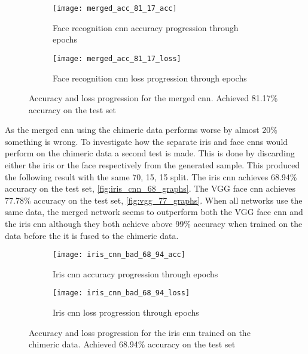 \begin{figure}[H]
	\centering
	\begin{subfigure}{0.48\textwidth}
		\centering
		\texttt{[image: merged\_acc\_81\_17\_acc]}
		\caption{Face recognition \gls{cnn} accuracy progression through epochs}
		\label{fig:merged_acc}
	\end{subfigure}
	\begin{subfigure}{0.48\textwidth}
		\centering
		\texttt{[image: merged\_acc\_81\_17\_loss]}
		\caption{Face recognition \gls{cnn} loss progression through epochs}
		\label{fig:merged_loss}
	\end{subfigure}
	\caption{Accuracy and loss progression for the merged \gls{cnn}. Achieved 81.17\% accuracy on the test set}
	\label{fig:merged_graphs}
\end{figure}

\noindent As the merged \gls{cnn} using the chimeric data performs worse by almost 20\% something is wrong. To investigate how the separate iris and face \gls{cnn}s would perform on the chimeric data a second test is made. This is done by discarding either the iris or the face respectively from the generated sample. This produced the following result with the same 70, 15, 15 split.  The iris \gls{cnn} achieves 68.94\% accuracy on the test set, \autoref{fig:iris_cnn_68_graphs}. The VGG face \gls{cnn} achieves 77.78\% accuracy on the test set, \autoref{fig:vgg_77_graphs}. When all networks use the same data, the merged network seems to outperform both the VGG face \gls{cnn} and the iris \gls{cnn} although they both achieve above 99\% accuracy when trained on the data before the it is fused to the chimeric data.

\begin{figure}[H]
	\centering
	\begin{subfigure}{0.48\textwidth}
		\centering
		\texttt{[image: iris\_cnn\_bad\_68\_94\_acc]}
		\caption{Iris \gls{cnn} accuracy progression through epochs}
		\label{fig:iris_cnn_68_acc}
	\end{subfigure}
	\begin{subfigure}{0.48\textwidth}
		\centering
		\texttt{[image: iris\_cnn\_bad\_68\_94\_loss]}
		\caption{Iris \gls{cnn} loss progression through epochs}
		\label{fig:iris_cnn_68_loss}
	\end{subfigure}
	\caption{Accuracy and loss progression for the iris \gls{cnn} trained on the chimeric data. Achieved 68.94\% accuracy on the test set}
	\label{fig:iris_cnn_68_graphs}
\end{figure}


